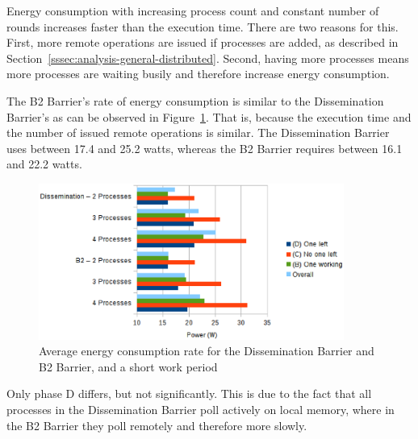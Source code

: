 \documentclass[a4paper, 10pt]{article}
\begin{document}
Energy consumption with increasing process count and constant number of rounds increases faster than the execution time. There are two reasons for this. First, more remote operations are issued if processes are added, as described in Section~\ref{sssec:analysis-general-distributed}. Second, having more processes means more processes are waiting busily and therefore increase energy consumption.

The B2 Barrier's rate of energy consumption is similar to the Dissemination Barrier's as can be observed in Figure~\ref{fig:d2-power-work-100}.
That is, because the execution time and the number of issued remote operations is similar.
The Dissemination Barrier uses between 17.4 and 25.2 watts, whereas the B2 Barrier requires between 16.1 and 22.2 watts.
\begin{figure}[htbp]
	\centering
	\includegraphics[width=10cm]{charts/d2-power-work-100}
	\caption{Average energy consumption rate for the Dissemination Barrier and B2 Barrier, and a short work period}
	\label{fig:d2-power-work-100}
\end{figure}
Only phase D differs, but not significantly.
This is due to the fact that all processes in the Dissemination Barrier poll actively on local memory, where in the B2 Barrier they poll remotely and therefore more slowly.
\end{document}
